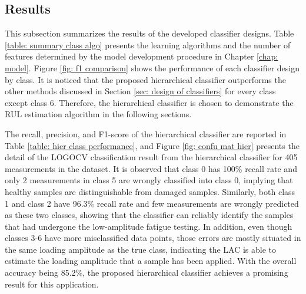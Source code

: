 \subsection{Results}
This subsection summarizes the results of the developed classifier designs. Table \ref{table: summary class algo} presents the learning algorithms and the number of features determined by the model development procedure in Chapter \ref{chap: model}. Figure \ref{fig: f1 comparison} shows the performance of each classifier design by class. It is noticed that the proposed hierarchical classifier outperforms the other methods discussed in Section \ref{sec: design of classifiers} for every class except class 6. Therefore, the hierarchical classifier is chosen to demonstrate the RUL estimation algorithm in the following sections.

The recall, precision, and F1-score of the hierarchical classifier are reported in Table \ref{table: hier class performance}, and Figure \ref{fig: confu mat hier} presents the detail of the LOGOCV classification result from the hierarchical classifier for 405 measurements in the dataset. It is observed that class 0 has 100\% recall rate and only 2 measurements in class 5 are wrongly classified into class 0, implying that healthy samples are distinguishable from damaged samples. Similarly, both class 1 and class 2 have 96.3\% recall rate and few measurements are wrongly predicted as these two classes, showing that the classifier can reliably identify the samples that had undergone the low-amplitude fatigue testing. In addition, even though classes 3-6 have more misclassified data points, those errors are mostly situated in the same loading amplitude as the true class, indicating the LAC is able to estimate the loading amplitude that a sample has been applied. With the overall accuracy being 85.2\%, the proposed hierarchical classifier achieves a promising result for this application.


